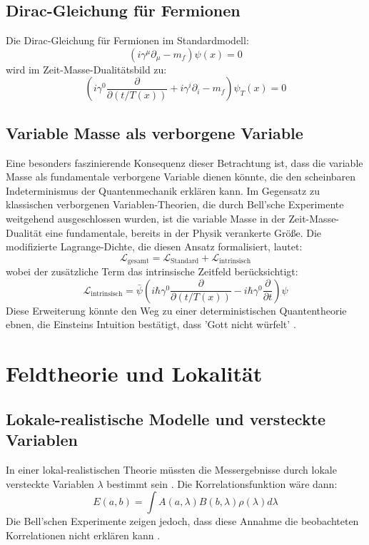 \documentclass[12pt,a4paper]{article}
\newcommand{\Tfield}{T(x)}
\begin{document}
	\subsection{Dirac-Gleichung für Fermionen}
	Die Dirac-Gleichung für Fermionen im Standardmodell:
	\begin{equation}
		(i\gamma^\mu\partial_\mu - m_f) \psi(x) = 0
	\end{equation}
	wird im Zeit-Masse-Dualitätsbild zu:
	\begin{equation}
		\left(i\gamma^0\frac{\partial}{\partial(t/\Tfield)} + i\gamma^i\partial_i - m_f\right) \psi_T(x) = 0
	\end{equation}
	
	\subsection{Variable Masse als verborgene Variable}
	Eine besonders faszinierende Konsequenz dieser Betrachtung ist, dass die variable Masse als fundamentale verborgene Variable dienen könnte, die den scheinbaren Indeterminismus der Quantenmechanik erklären kann. Im Gegensatz zu klassischen verborgenen Variablen-Theorien, die durch Bell'sche Experimente weitgehend ausgeschlossen wurden, ist die variable Masse in der Zeit-Masse-Dualität eine fundamentale, bereits in der Physik verankerte Größe.
	Die modifizierte Lagrange-Dichte, die diesen Ansatz formalisiert, lautet:
	\begin{equation}
		\mathcal{L}_\text{gesamt} = \mathcal{L}_\text{Standard} + \mathcal{L}_\text{intrinsisch}
	\end{equation}
	wobei der zusätzliche Term das intrinsische Zeitfeld berücksichtigt:
	\begin{equation}
		\mathcal{L}_\text{intrinsisch} = \bar{\psi}\left(i\hbar\gamma^0 \frac{\partial}{\partial (t/\Tfield)} - i\hbar\gamma^0 \frac{\partial}{\partial t}\right)\psi
	\end{equation}
	Diese Erweiterung könnte den Weg zu einer deterministischen Quantentheorie ebnen, die Einsteins Intuition bestätigt, dass 'Gott nicht würfelt' \cite{Pascher2024}.
	
	\section{Feldtheorie und Lokalität}
	\subsection{Lokale-realistische Modelle und versteckte Variablen}
	In einer lokal-realistischen Theorie müssten die Messergebnisse durch lokale versteckte Variablen \(\lambda\) bestimmt sein \cite{Bell1964}. Die Korrelationsfunktion wäre dann:
	\begin{equation}
		E(a,b) = \int A(a,\lambda)B(b,\lambda)\rho(\lambda)d\lambda
	\end{equation}
	Die Bell'schen Experimente zeigen jedoch, dass diese Annahme die beobachteten Korrelationen nicht erklären kann \cite{Aspect1982}.
	
\end{document}
